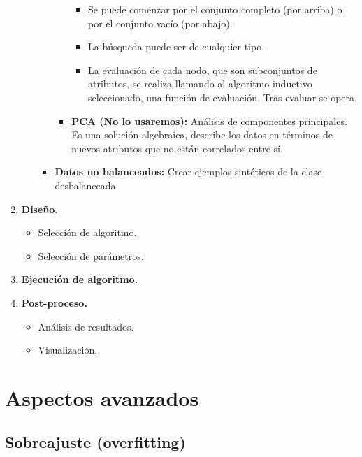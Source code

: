 \documentclass[12pt]{report} %
\begin{document}
\begin{enumerate}
\begin{itemize}
\begin{itemize}
\begin{itemize}
\begin{itemize}
        \item
          Se puede comenzar por el conjunto completo (por arriba) o por
          el conjunto vacío (por abajo).
        \item
          La búsqueda puede ser de cualquier tipo.
        \item
          La evaluación de cada nodo, que son subconjuntos de atributos,
          se realiza llamando al algoritmo inductivo seleccionado, una
          función de evaluación. Tras evaluar se opera.
        \end{itemize}
      \item
        \textbf{PCA (No lo usaremos):} Análisis de componentes
        principales. Es una solución algebraica, describe los datos en
        términos de nuevos atributos que no están correlados entre sí.
      \end{itemize}
    \item
      \textbf{Datos no balanceados:} Crear ejemplos sintéticos de la
      clase desbalanceada.
    \end{itemize}
  \end{itemize}
\item
  \textbf{Diseño}.

  \begin{itemize}
  
  \item
    Selección de algoritmo.
  \item
    Selección de parámetros.
  \end{itemize}
\item
  \textbf{Ejecución de algoritmo.}
\item
  \textbf{Post-proceso.}

  \begin{itemize}
  
  \item
    Análisis de resultados.
  \item
    Visualización.
  \end{itemize}
\end{enumerate}

\section{Aspectos avanzados}

\subsection{Sobreajuste
(overfitting)}
\end{document}

